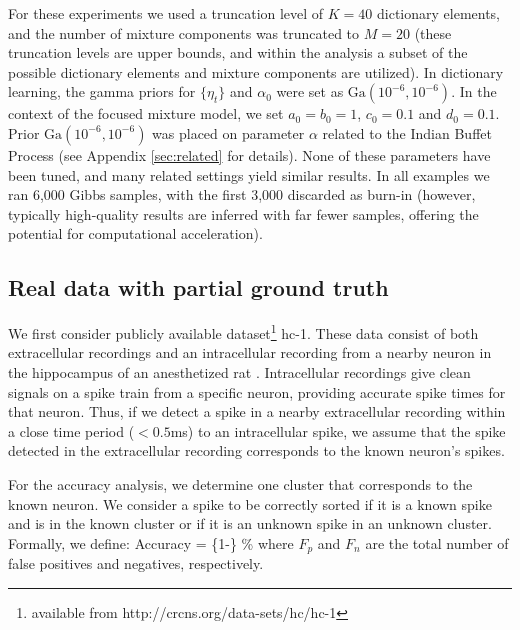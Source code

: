 \documentclass[journal]{IEEEtran}
\begin{document}
For these experiments we used a truncation level of
$K=40$ dictionary elements, and the number of mixture components was
truncated to $M=20$ (these truncation levels are upper bounds, and within the analysis a subset of the possible dictionary elements and mixture components are utilized).  In dictionary learning, the gamma priors for
$\{\eta_t\}$ and $\alpha_0$ were set as
$\mbox{Ga}(10^{-6},10^{-6})$. In the context of the {focused mixture model}, we set $a_0=b_0=1$, $c_0=0.1$ and
$d_0=0.1$. Prior $\mbox{Ga}(10^{-6},10^{-6})$ was placed on
parameter $\alpha$ related to the {Indian Buffet Process (see Appendix}  \ref{sec:related} {for details)}. None of these parameters have
been tuned, and many related settings yield similar results. In all
examples we ran 6,000 Gibbs samples, with the first 3,000 discarded
as burn-in (however, typically high-quality results are inferred with far fewer samples, offering the potential for computational acceleration).

\subsection{Real data with partial ground truth} 
\label{sec:truth}
We
first consider publicly available dataset\footnote{available from
http://crcns.org/data-sets/hc/hc-1} hc-1. These data consist of both
extracellular recordings and an intracellular recording from a
nearby neuron in the hippocampus of an anesthetized rat
\cite{Henze2000}.  Intracellular recordings give clean signals on a
spike train from a specific neuron, providing accurate spike times for
that neuron.  Thus, if we detect a spike in a nearby extracellular
recording within a close time period ($<0.5$ms) to an intracellular
spike, we assume that the spike detected in the extracellular
recording corresponds to the known neuron's spikes.

For the accuracy analysis, we determine one cluster that corresponds to the
known neuron.  We consider a spike to be correctly sorted if
it is a known spike and is in the known cluster or if it is an
unknown spike in {an} unknown cluster. 
{Formally, we define:}
\beq
\mbox{Accuracy} = \left\{1-\right\} \%
\eeq
{where $F_p$ and $F_n$ are the total number of false positives and negatives, respectively.}
\end{document}
